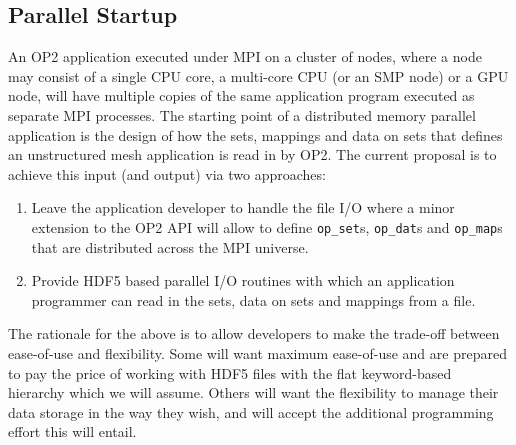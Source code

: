\documentclass[12pt]{article}
\begin{document}
\subsection{Parallel Startup}\label{subsec/startup}
An OP2 application executed under MPI on a cluster of nodes, where a node may consist of a single CPU core, a
multi-core CPU (or an SMP node) or a GPU node, will have multiple copies of the same application program executed as
separate MPI processes. The starting point of a distributed memory parallel application is the design of how the sets,
mappings and data on sets that defines an unstructured mesh application is read in by OP2. The current proposal is to
achieve this input (and output) via two approaches:
\begin{enumerate}
\item Leave the application developer to handle the file I/O where a minor extension to the OP2 API will allow to
define \texttt{op\_set}s, \texttt{op\_dat}s and \texttt{op\_map}s that are distributed across the MPI universe. 
\item Provide HDF5 based parallel I/O routines with which an application programmer can read in the sets, data on
sets and mappings from a file. 
\end{enumerate}
The rationale for the above is to allow developers to make the trade-off between ease-of-use and flexibility. Some will
want maximum ease-of-use and are prepared to pay the price of working with HDF5 files with the flat keyword-based
hierarchy which we will assume. Others will want the flexibility to manage their data storage in the way they wish, and
will accept the additional programming effort this will entail.
\end{document}
